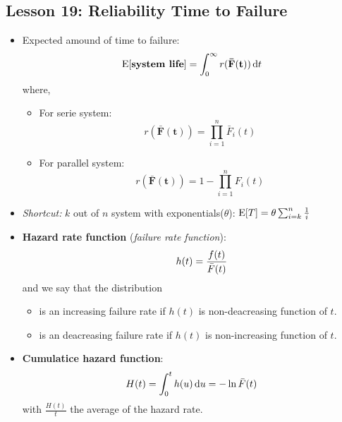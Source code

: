 \documentclass[10pt, french]{article}
\begin{document}
\begin{multicols*}{3}
\section*{Lesson 19: Reliability Time to Failure}
\begin{itemize}[align=left,leftmargin=*]
    \item Expected amound of time to failure: \[ \mathrm{E} {\left[ \textbf{system life} \right]} = \int_0^\infty r(\mathbf{\bar{F}(t)}) \mathop{}\!\mathrm{d}{t} \]
    where,
    \begin{itemize}
        \item For serie system: \[ r(\mathbf{\bar{F}(t)}) = \prod_{i=1}^n \bar{F}_i(t) \]
        \item For parallel system: \[ r(\mathbf{\bar{F}(t)}) = 1 - \prod_{i=1}^n F_i(t) \]
    \end{itemize}
    \item \emph{Shortcut:} $k$ out of $n$ system with exponentials($\theta$): $\mathrm{E} {\left[ T \right]}=\theta \sum_{i=k}^n \frac{1}{i}$
    \item \textbf{Hazard rate function} (\emph{failure rate function}): \[ \hspace{.7cm} h(t) = \frac{f(t)}{\bar{F}(t)} \]
    and we say that the distribution
    \begin{itemize}
        \item is an increasing failure rate if $h(t)$ is non-deacreasing function of $t$.
        \item is an deacreasing failure rate if $h(t)$ is non-increasing function of $t$. 
    \end{itemize}
    \item \textbf{Cumulatice hazard function}: \[ H(t) = \int_0^t h(u) \mathop{}\!\mathrm{d}{u}= -\ln \bar{F}(t)  \] with $\frac{H(t)}{t}$ the average of the hazard rate.
\end{itemize}

\def\SectionColor{purple!80!white}

\end{multicols*}
\end{document}
